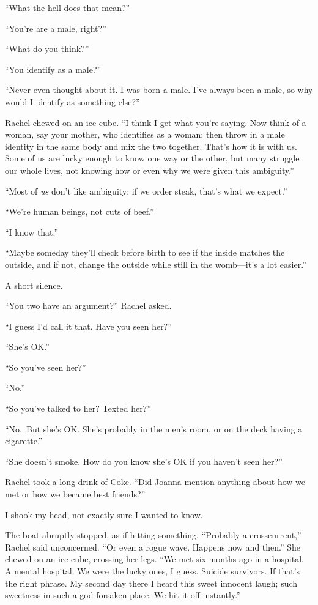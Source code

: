 ``What the hell does that mean?''

``You're are a male, right?''

``What do you think?''

``You identify as a male?''

``Never even thought about it. I was born a male. I've always been a
male, so why would I identify as something else?''

Rachel chewed on an ice cube. ``I think I get what you're saying. Now
think of a woman, say your mother, who identifies as a woman; then throw
in a male identity in the same body and mix the two together. That's how
it is with us. Some of us are lucky enough to know one way or the other,
but many struggle our whole lives, not knowing how or even why we were
given this ambiguity.''

``Most of \emph{us} don't like ambiguity; if we order steak, that's what
we expect.''

``We're human beings, not cuts of beef.''

``I know that.''

``Maybe someday they'll check before birth to see if the inside matches
the outside, and if not, change the outside while still in the
womb---it's a lot easier.''

A short silence.

``You two have an argument?'' Rachel asked.

``I guess I'd call it that. Have you seen her?''

``She's OK.''

``So you've seen her?''

``No.''

``So you've talked to her? Texted her?''

``No.~But she's OK. She's probably in the men's room, or on the deck
having a cigarette.''

``She doesn't smoke. How do you know she's OK if you haven't seen her?''

Rachel took a long drink of Coke. ``Did Joanna mention anything about
how we met or how we became best friends?''

I shook my head, not exactly sure I wanted to know.

The boat abruptly stopped, as if hitting something. ``Probably a
crosscurrent,'' Rachel said unconcerned. ``Or even a rogue wave. Happens
now and then.'' She chewed on an ice cube, crossing her legs. ``We met
six months ago in a hospital. A mental hospital. We were the lucky ones,
I guess. Suicide survivors. If that's the right phrase. My second day
there I heard this sweet innocent laugh; such sweetness in such a
god-forsaken place. We hit it off instantly.''

